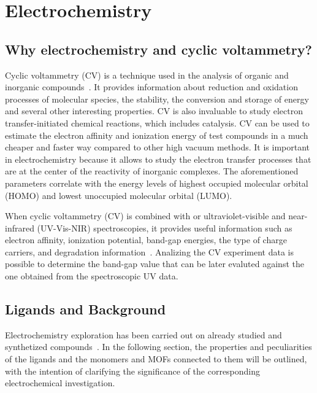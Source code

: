 \documentclass[../Master.tex]{subfiles}
\begin{document}
\newpage
\section{Electrochemistry}\label{sec:electrochemistry}

\subsection{Why electrochemistry and cyclic voltammetry?}\label{sec:elect-intro}

Cyclic voltammetry (CV) is a technique used in the analysis of organic and inorganic compounds\ \cite{elgrishi_practical_2018}. It provides information about reduction and oxidation processes of molecular species, the stability, the conversion and storage of energy and several other interesting properties. CV is also invaluable to study electron transfer-initiated chemical reactions, which includes catalysis. CV can be used to estimate the electron affinity and ionization energy of test compounds in a much cheaper and faster way compared to other high vacuum methods. It is important in electrochemistry because it allows to study the electron transfer processes that are at the center of the reactivity of inorganic complexes.
The aforementioned parameters correlate with the energy levels of highest occupied molecular orbital (HOMO) and lowest unoccupied molecular orbital (LUMO).

When cyclic voltammetry (CV) is combined with or ultraviolet-visible and near-infrared (UV-Vis-NIR) spectroscopies, it provides useful information such as electron affinity, ionization potential, band-gap energies, the type of charge carriers, and degradation information\ \cite{pluczyk_using_2018}. Analizing the CV experiment data is possible to determine the band-gap value that can be later evaluted against the one obtained from the spectroscopic UV data.

\subsection{Ligands and Background}

Electrochemistry exploration has been carried out on already studied and synthetized compounds\ \cite{carlucci_heterometallic_2010}. In the following section, the properties and peculiarities of the ligands and the monomers and MOFs connected to them will be outlined, with the intention of clarifying the significance of the corresponding electrochemical investigation.\\
\end{document}
